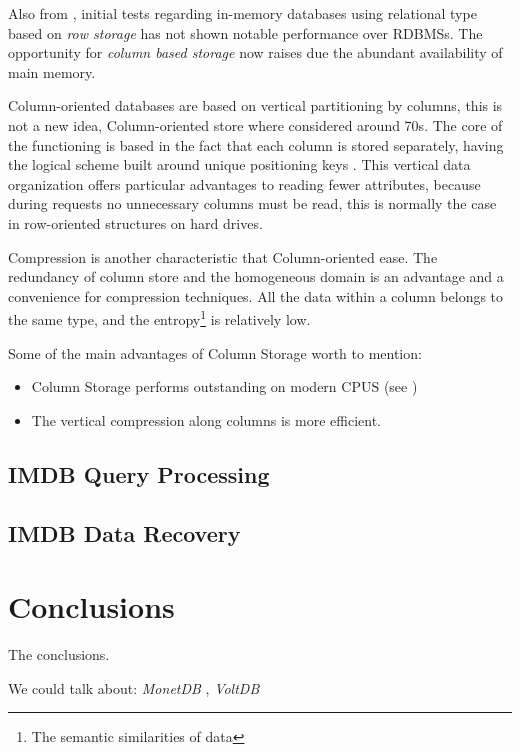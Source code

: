 \documentclass[10pt]{article} %
\begin{document}
Also from \cite{Plattner}, initial tests regarding in-memory databases using relational type based on \emph{ row storage } has not shown notable performance over RDBMSs. The opportunity for \emph{column based storage} now raises due the abundant availability of main memory. 

Column-oriented databases are based on vertical partitioning by columns, this is not a new idea, Column-oriented store where considered around 70s. The core of the functioning is based in the fact that each column is stored separately, having the logical scheme built around unique positioning keys \cite{krueger2011main}. This vertical data organization offers particular advantages to reading fewer attributes, because during requests no unnecessary columns must be read, this is normally the case in row-oriented structures on hard drives.

Compression is another characteristic that Column-oriented ease. The redundancy of column store and the homogeneous domain is an advantage and a convenience for compression techniques. All the data within a column belongs to the same type, and the entropy\footnote{The semantic similarities of data} is relatively low. 

Some of the main advantages of Column Storage worth to mention:
\begin{itemize}
    \item Column Storage performs outstanding on modern CPUS (see \cite{Plattner})
    \item The vertical compression along columns is more efficient.
  \end{itemize}

\subsection{IMDB Query Processing}
\subsection{IMDB Data Recovery}


\section{Conclusions} 
The conclusions.

We could talk about: \emph{ MonetDB }, \emph{ VoltDB }





\end{document}
